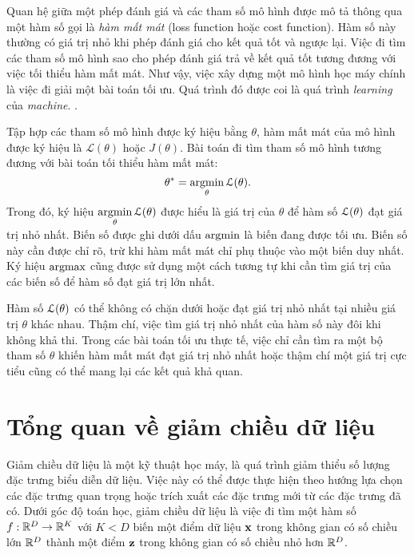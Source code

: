 Quan hệ giữa một phép đánh giá và các tham số mô hình được mô tả thông qua một
hàm số gọi là \textit{hàm mất mát} ({loss function} hoặc
{cost function}). Hàm số này thường có giá trị nhỏ khi
phép đánh giá cho kết quả tốt và ngược lại. Việc đi tìm các tham số mô hình sao
cho phép đánh giá trả về kết quả tốt tương đương với việc tối thiểu hàm mất mát.
Như vậy, việc xây dựng một mô hình học máy chính là việc đi giải một
bài toán tối ưu. Quá trình đó được coi là quá trình \textit{learning} của
\textit{machine}. \cite{V1}.

Tập hợp các tham số mô hình được ký hiệu bằng $\theta$, hàm mất mát của
mô hình được ký hiệu là $\mathcal{L}(\theta)$ hoặc $J(\theta)$. Bài toán đi tìm tham số mô hình tương đương với bài toán tối thiểu hàm mất mát:
\begin{equation}
\theta^* = \operatorname*{argmin}_{\theta}\mathcal{L}(\theta).
\end{equation}
Trong đó, ký hiệu $\displaystyle \operatorname*{argmin}_{\theta}\mathcal{L}(\theta)$ được hiểu là giá
trị của $\theta$ để hàm số $\mathcal{L}(\theta)$ đạt giá trị nhỏ nhất. Biến số được ghi
dưới dấu $\operatorname*{argmin}$ là biến đang được tối ưu. Biến số này cần được chỉ rõ, trừ
khi hàm mất mát chỉ phụ thuộc vào một biến duy nhất. Ký hiệu $\operatorname*{argmax}$ cũng được
sử dụng một cách tương tự khi cần tìm giá trị của các biến số để hàm số đạt giá
trị lớn nhất.

Hàm số $\mathcal{L}(\theta)$ có thể không có chặn dưới hoặc đạt giá trị nhỏ nhất tại
nhiều giá trị $\theta$ khác nhau. Thậm chí, việc tìm giá trị nhỏ nhất của hàm số
này đôi khi không khả thi. Trong các bài toán tối ưu thực tế, việc chỉ cần tìm
ra một bộ tham số $\theta$ khiến hàm mất mát đạt giá trị nhỏ nhất hoặc thậm chí
một giá trị cực tiểu cũng có thể mang lại các kết quả khả quan.
\section{Tổng quan về giảm chiều dữ liệu}
Giảm chiều dữ liệu là một kỹ thuật học máy, là quá trình giảm thiểu số lượng đặc trưng biểu diễn dữ liệu. Việc này có thể được thực hiện theo hướng lựa chọn các đặc trưng quan trọng hoặc trích xuất các đặc trưng mới từ các đặc trưng đã có. Dưới góc độ toán học, giảm chiều dữ liệu là việc đi tìm một hàm số $f: \mathbb{R}^D \rightarrow \mathbb{R}^K$ với $K < D$ biến một điểm dữ liệu $\mathbf{x}$ trong không gian có số chiều lớn $\mathbb{R}^D$ thành một điểm $\mathbf{z}$ trong không gian có số chiều nhỏ hơn $\mathbb{R}^D$. 

